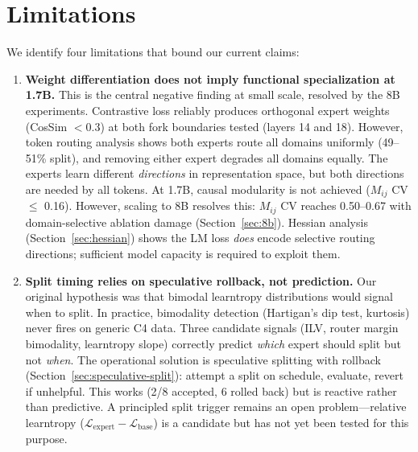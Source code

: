 \documentclass{article}
\begin{document}
\section{Limitations}
\label{sec:limitations}

We identify four limitations that bound our current claims:

\begin{enumerate}
    \item \textbf{Weight differentiation does not imply functional
          specialization at 1.7B.} This is the central negative finding at
          small scale, resolved by the 8B experiments.
          Contrastive loss reliably produces orthogonal expert weights
          (CosSim $<$0.3) at both fork boundaries tested (layers 14 and 18).
          However, token routing analysis shows both experts route all domains
          uniformly (49--51\% split), and removing either expert degrades all
          domains equally. The experts learn different \emph{directions} in
          representation space, but both directions are needed by all tokens.
          At 1.7B, causal modularity is not achieved ($M_{ij}$ CV $\leq$ 0.16).
          However, scaling to 8B resolves this: $M_{ij}$ CV reaches 0.50--0.67
          with domain-selective ablation damage (Section~\ref{sec:8b}).
          Hessian analysis (Section~\ref{sec:hessian}) shows the LM loss
          \emph{does} encode selective routing directions; sufficient model
          capacity is required to exploit them.
    \item \textbf{Split timing relies on speculative rollback, not prediction.}
          Our original hypothesis was that bimodal learntropy distributions
          would signal when to split. In practice, bimodality detection
          (Hartigan's dip test, kurtosis) never fires on generic C4 data.
          Three candidate signals (ILV, router margin bimodality, learntropy
          slope) correctly predict \emph{which} expert should split but not
          \emph{when}. The operational solution is speculative splitting with
          rollback (Section~\ref{sec:speculative-split}): attempt a split on
          schedule, evaluate, revert if unhelpful. This works (2/8 accepted,
          6 rolled back) but is reactive rather than predictive. A principled
          split trigger remains an open problem---relative learntropy
          ($\mathcal{L}_{\text{expert}} - \mathcal{L}_{\text{base}}$) is a
          candidate but has not yet been tested for this purpose.

\end{enumerate}
\end{document}
